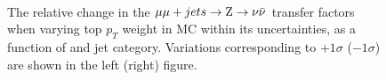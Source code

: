 \begin{figure}[]
  \centering
   ~~
  \\

  \caption{\label{fig:tfSyst_topPt_mumuToZinv} The relative change in the $\mmj \rightarrow \znunu$ transfer
  factors when varying top $p_{T}$ weight in MC within its uncertainties, as a function of \scalht and jet category. 
  Variations corresponding to $+1\sigma$ ($-1\sigma$) are shown in the left (right) figure. 
  }
\end{figure}

